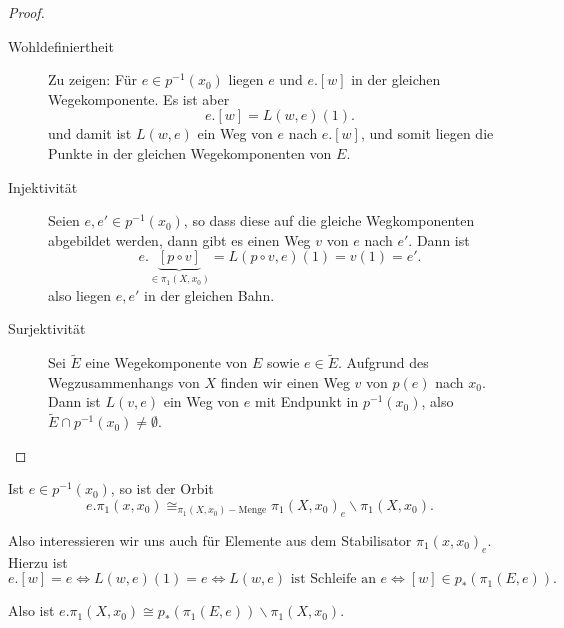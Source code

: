 \begin{proof}
    \begin{description}
        \item[Wohldefiniertheit] Zu zeigen: Für $e\in p^{-1} (x_0)$ liegen $e$ und  $e.[w]$ in der gleichen Wegekomponente. Es ist aber
             \[
                 e.[w] = L(w,e)(1)
            .\] 
            und damit ist $L(w,e)$ ein Weg von  $e$ nach  $e.[w]$, und somit liegen die Punkte in der gleichen Wegekomponenten von  $E$.
        \item[Injektivität] Seien  $e,e'\in p^{-1} (x_0)$, so dass diese auf die gleiche Wegkomponenten abgebildet werden, dann gibt es einen Weg $v$ von  $e$ nach  $e'$. Dann ist
             \[
                 e.\underbrace{[p \circ  v]}_{\in \pi_1(X,x_0)}  = L(p \circ  v, e)(1) = v(1) = e'
            .\] 
            also liegen $e,e'$ in der gleichen Bahn.
        \item[Surjektivität] Sei  $\tilde{E}$ eine Wegekomponente von $E$ sowie  $e\in \tilde{E}$. Aufgrund des Wegzusammenhangs von $X$ finden wir einen Weg  $v$ von  $p(e)$ nach  $x_0$. Dann ist $L(v,e)$ ein Weg von  $e$ mit Endpunkt in  $p^{-1} (x_0)$, also $\tilde{E} \cap  p^{-1} (x_0) \neq  \emptyset$.
    \end{description}
\end{proof}

Ist $e\in p^{-1} (x_0)$, so ist der Orbit
\[
    e.\pi_1(x,x_0) \cong_{\pi_1(X,x_0)-\text{Menge}} \pi_1(X,x_0)_e \backslash \pi_1(X,x_0)
.\] 

Also interessieren wir uns auch für Elemente aus dem Stabilisator $\pi_1(x,x_0)_e$. Hierzu ist
\[
    e.[w] = e \iff  L(w,e)(1) = e \iff  L(w,e) \text{ ist Schleife an } e \iff  [w] \in  p_*(\pi_1(E,e))
.\] 

Also ist $e.\pi_1(X,x_0) \cong p_*(\pi_1(E,e)) \backslash \pi_1(X,x_0)$.

